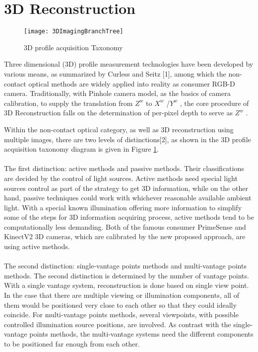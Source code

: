 \section{3D Reconstruction}
%
\begin{figure}[h]
\centering
\texttt{[image: 3DImagingBranchTree]}
\caption{ 3D profile acquisition Taxonomy}
\label{3DImagingTaxonomy}
\end{figure}%
\par%
Three dimensional (3D) profile measurement technologies have been developed by various means, as summarized by Curless and Seitz [1], %
among which the non-contact optical methods are widely applied into reality as consumer RGB-D camera. Traditionally, with Pinhole camera model, as the basics of camera calibration, to supply the translation from \(Z^{w}\)  to \(X^{w}\) /\(Y^{w}\) , the core procedure of 3D Reconstruction falls on the determination of per-pixel depth to serve as \(Z^{w}\) .\par%
%
Within the non-contact optical category, as well as 3D reconstruction using multiple images, there are two levels of distinctions[2],
 as shown in the 3D profile acquisition taxonomy diagram is given in Figure \ref{3DImagingTaxonomy}.
 \\\\The first distinction: active methods and passive methods. Their classifications are decided by the control of light sources. Active methods need special light sources control as part of the strategy to get 3D information, while on the other hand, passive techniques could work with whichever reasonable available ambient light. With a special known illumination offering more information to simplify some of the steps for 3D information acquiring process, active methods tend to be computationally less demanding. Both of the famous consumer PrimeSense and KinectV2 3D cameras, which are calibrated by the new proposed approach, are using active methods.
\\\\The second distinction: single-vantage points methods and multi-vantage points methods. The second distinction is determined by the number of vantage points. With a single vantage system, reconstruction is done based on single view point. In the case that there are multiple viewing or illumination components, all of them would be positioned very close to each other so that they could ideally coincide. For multi-vantage points methods, several viewpoints, with possible controlled illumination source positions, are involved. As contrast with the single-vantage points methods, the multi-vantage systems need the different components to be positioned far enough from each other. 
